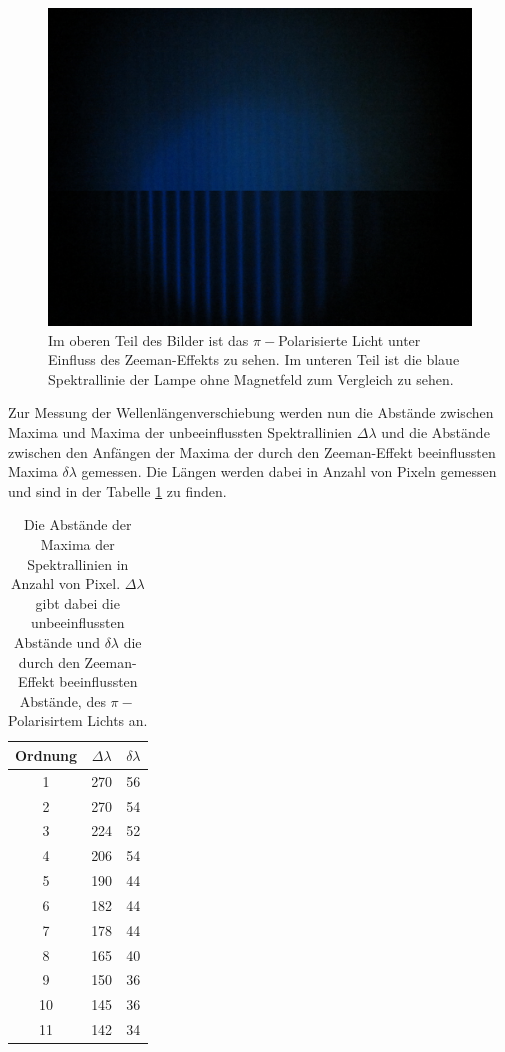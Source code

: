 \begin{figure}
    \centering
    \includegraphics[width=\textwidth]{content/data/Blau_0_pi_uebernander.JPG}
    \caption{Im oberen Teil des Bilder ist das $\pi -$Polarisierte Licht unter Einfluss des Zeeman-Effekts zu sehen. Im unteren Teil ist die blaue Spektrallinie der Lampe ohne Magnetfeld zum Vergleich zu sehen.}
    \label{fig:pi-blau}
\end{figure}

Zur Messung der Wellenlängenverschiebung werden nun die Abstände zwischen Maxima und Maxima der unbeeinflussten Spektrallinien $\Delta \lambda$
und die Abstände zwischen den Anfängen der Maxima der durch den Zeeman-Effekt beeinflussten Maxima $\delta \lambda$ gemessen.
Die Längen werden dabei in Anzahl von Pixeln gemessen und sind in der Tabelle \ref{tab:blau-pi} zu finden.

\begin{table}
    \centering
    \caption{Die Abstände der Maxima der Spektrallinien in Anzahl von Pixel.
    $\Delta \lambda$ gibt dabei die unbeeinflussten Abstände und $\delta \lambda$ die durch den Zeeman-Effekt beeinflussten Abstände, des $\pi -$ Polarisirtem Lichts an.}
    \begin{tabular}{ccc}
        \toprule
        Ordnung & $\Delta \lambda$ & $\delta \lambda $  \\
        \midrule
        1  &    270 &   56  \\
        2  &    270 &   54  \\
        3  &    224 &   52  \\
        4  &    206 &   54  \\
        5  &    190 &   44  \\
        6  &    182 &   44  \\
        7  &    178 &   44  \\
        8  &    165 &   40  \\
        9  &    150 &   36  \\
        10 &    145 &   36  \\
        11 &    142 &   34  \\
    \end{tabular}
    \label{tab:blau-pi}
\end{table}

